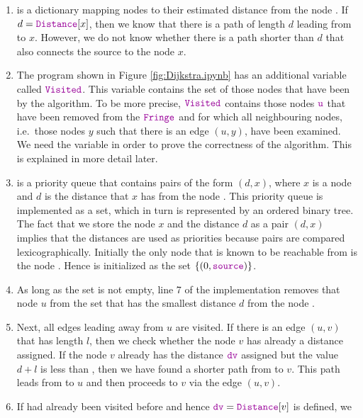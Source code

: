 \begin{enumerate}
\item {} is a dictionary mapping nodes to their estimated distance from the node
      .  If $d = \mytt{Distance}[x]$, then we know that there is a path of length $d$ leading
      from  to $x$.  However, we do not know whether there is a path shorter
      than $d$ that also connects the source to the node $x$.
\item The program shown in Figure \ref{fig:Dijkstra.ipynb} has an additional variable called $\mytt{Visited}$.
      This variable contains the set of those nodes that have been   by the algorithm.
      To be more precise, $\mytt{Visited}$ contains those nodes $\mytt{u}$ that have been removed from the
      $\mytt{Fringe}$ and for which all neighbouring nodes, i.e.~those nodes $y$ such that
      there is an edge $(u,y)$, have been examined.  We need the variable  in order to prove
      the correctness of the algorithm.  This is explained in more detail later.
\item {} is a priority queue that contains pairs of the form $(d, x)$, where $x$ is a node and $d$
      is the distance that $x$ has from the node .  This priority queue is implemented as a set,
      which in turn is represented by an ordered binary tree.  The fact that we store the node $x$ and the
      distance $d$ as a pair $(d,x)$ implies that the distances are used as priorities because pairs are
      compared lexicographically.
      Initially the only node that is known to be
      reachable from  is the node .  Hence  is initialized as the
      set $\{ (0, \mytt{source}) \}$.
\item As long as the set  is not empty, line 7 of the implementation removes that node $u$
      from the set  that has the smallest distance $d$ from the node .
\item Next, all edges leading away from $u$ are visited.  If there is an edge $(u, v)$ that has length $l$,
      then we check whether the node $v$ has already a distance assigned.  If the node $v$ already has the
      distance $\mytt{dv}$ assigned but the value $d + l$ is less than , then we have found a
      shorter path from  to $v$.  This path leads from  to $u$ and then proceeds
      to $v$ via the edge $(u,v)$.
\item If  had already been visited before and hence $\mytt{dv}=\mytt{Distance}[v]$ is defined, we

\end{enumerate}
